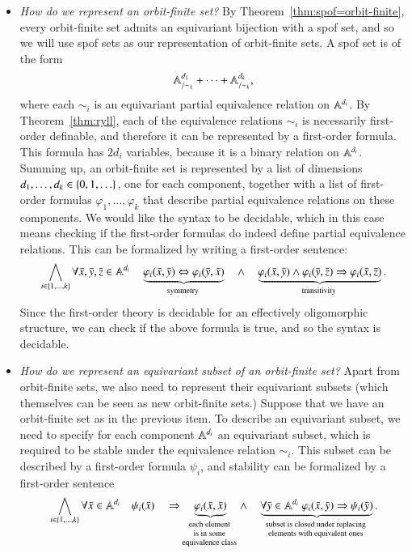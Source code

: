 \begin{itemize}
	\item \emph{How do we represent an orbit-finite set?} By Theorem~\ref{thm:spof=orbit-finite}, every orbit-finite set admits an equivariant bijection with a spof set, and so we  will use spof sets as our representation of orbit-finite sets. A spof set is of the form 
	\begin{align*}
	\mathbb A^{d_1}_{/\sim_1} + \cdots + \mathbb A^{d_k}_{/\sim_k},
	\end{align*}
	where each $\sim_{i}$ is an equivariant partial equivalence relation on $\mathbb A^{d_i}$. By Theorem~\ref{thm:ryll}, each of the equivalence relations $\sim_i$ is necessarily first-order definable, and therefore it  can  be represented by a first-order formula. This formula  has $2d_i$ variables, because it is a binary relation on $\mathbb A^{d_i}$. Summing up, an orbit-finite set is represented by a list of dimensions $d_1,\ldots,d_k \in \{0,1,\ldots\}$, one for each component, together with a list of first-order formulas $\varphi_1,\ldots,\varphi_k$ that describe partial equivalence relations on these components. We would like the syntax to be decidable, which in this case means checking if the first-order formulas do indeed define partial equivalence relations.  This can be formalized by writing a first-order sentence: 
	\begin{align*}
	\bigwedge_{i \in \set{1,\ldots,k}} \forall \bar x, \bar y, \bar z  \in \atoms^{d_i} \quad 
	\myunderbrace{\varphi_i(\bar x, \bar y) \Leftrightarrow  \varphi_i(\bar y, \bar x)}{symmetry}\quad \land \quad
	\myunderbrace{\varphi_i(\bar x, \bar y) \land \varphi_i(\bar y, \bar z) \Rightarrow  \varphi_i(\bar x, \bar z)}{transitivity}.
	\end{align*}
	Since the first-order theory is decidable for an effectively oligomorphic structure, we can check if the above formula is true, and so the syntax is decidable. 
	\item \emph{How do we represent an equivariant subset of an orbit-finite set?} Apart from orbit-finite sets, we also need to represent their equivariant subsets (which themselves can be seen as new orbit-finite sets.) Suppose that we have an orbit-finite set as in the previous item. To describe an equivariant subset, we need to specify for each component $\mathbb A^{d_i}$ an equivariant subset, which is required to be stable under the equivalence relation $\sim_i$. This subset can be described by a first-order formula $\psi_i$,  and stability can be formalized by a first-order sentence 
	\begin{align*}
	\bigwedge_{i \in \set{1,\ldots,k}}  \forall \bar x \in \atoms^{d_i} \quad  \psi_i(\bar x)\quad \Rightarrow \quad 
	\myunderbrace{\varphi_i(\bar x, \bar x)}{each element \\ is in some \\ equivalence class} 
	\quad \land \quad 
	\myunderbrace{\forall \bar y \in \atoms^{d_i} 
\ \varphi_i(\bar x, \bar y) \Rightarrow \psi_i(\bar y)}{subset is closed under replacing\\ elements with equivalent ones}.
	\end{align*}	
\end{itemize}

